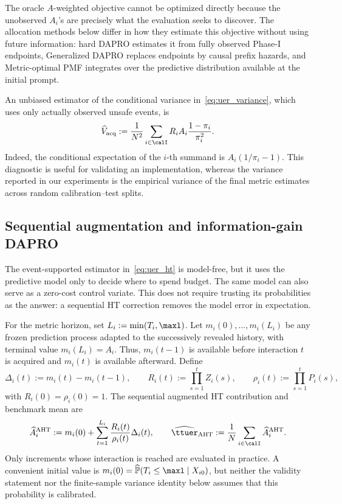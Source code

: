 The oracle $A$-weighted objective cannot be optimized directly because the
unobserved $A_i$'s are precisely what the evaluation seeks to discover.  The
allocation methods below differ in how they estimate this objective without
using future information: hard DAPRO estimates it from fully observed Phase-I
endpoints, Generalized DAPRO replaces endpoints by causal prefix hazards, and
Metric-optimal PMF integrates over the predictive distribution available at
the initial prompt.

An unbiased estimator of the conditional variance in~\eqref{eq:uer_variance},
which uses only actually observed unsafe events, is
\begin{equation}
    \widehat V_{\mathrm{acq}}
    :=\frac{1}{N^2}\sum_{i\in\calI}
    R_iA_i\frac{1-\pi_i}{\pi_i^2}.
    \label{eq:observed_variance_estimator}
\end{equation}
Indeed, the conditional expectation of the $i$-th summand is
$A_i(1/\pi_i-1)$.  This diagnostic is useful for validating an
implementation, whereas the variance reported in our experiments is the
empirical variance of the final metric estimates across random
calibration--test splits.

\subsection{Sequential augmentation and information-gain DAPRO}
\label{sec:sequential_augmented_ht}

The event-supported estimator in~\eqref{eq:uer_ht} is model-free, but it uses
the predictive model only to decide where to spend budget.  The same model
can also serve as a zero-cost control variate.  This does not require trusting
its probabilities as the answer: a sequential HT correction removes the
model error in expectation.

For the metric horizon, set $L_i:=\min(T_i,\maxl)$.  Let
$m_i(0),\ldots,m_i(L_i)$ be any frozen prediction process adapted to the
successively revealed history, with terminal value $m_i(L_i)=A_i$.  Thus,
$m_i(t-1)$ is available before interaction $t$ is acquired and $m_i(t)$ is
available afterward.  Define
\begin{equation}
    \Delta_i(t):=m_i(t)-m_i(t-1),
    \qquad
    R_i(t):=\prod_{s=1}^{t}Z_i(s),
    \qquad
    \rho_i(t):=\prod_{s=1}^{t}P_i(s),
\end{equation}
with $R_i(0)=\rho_i(0)=1$.  The sequential augmented HT contribution and
benchmark mean are
\begin{equation}
    \widehat A_i^{\mathrm{AHT}}
    :=m_i(0)+\sum_{t=1}^{L_i}
      \frac{R_i(t)}{\rho_i(t)}\Delta_i(t),
    \qquad
    \widehat{\ttuer}_{\mathrm{AHT}}
    :=\frac{1}{N}\sum_{i\in\calI}\widehat A_i^{\mathrm{AHT}}.
    \label{eq:sequential_aht_estimator}
\end{equation}
Only increments whose interaction is reached are evaluated in practice.  A
convenient initial value is
$m_i(0)=\widehat{\mathbb P}(T_i\leq\maxl\mid X_{i0})$, but neither the
validity statement nor the finite-sample variance identity below assumes
that this probability is calibrated.

